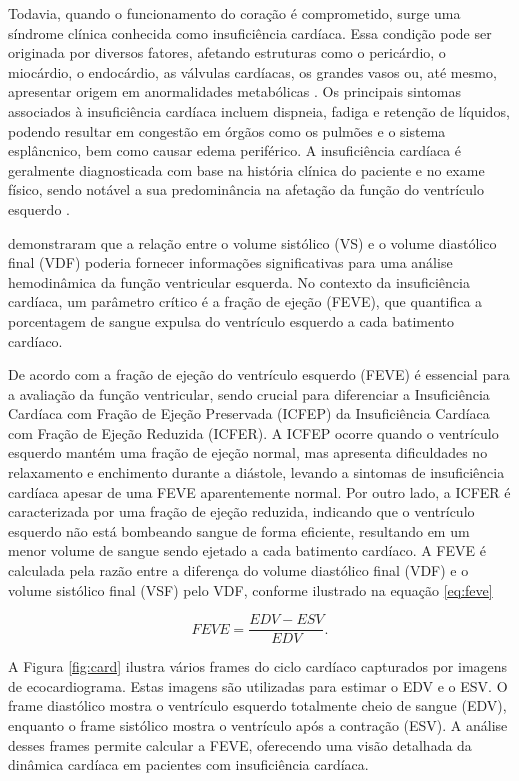 Todavia, quando o funcionamento do coração é comprometido, surge uma síndrome clínica conhecida como insuficiência cardíaca. Essa condição pode ser originada por diversos fatores, afetando estruturas como o pericárdio, o miocárdio, o endocárdio, as válvulas cardíacas, os grandes vasos ou, até mesmo, apresentar origem em anormalidades metabólicas \cite{YANCY2013e147}. Os principais sintomas associados à insuficiência cardíaca incluem dispneia, fadiga e retenção de líquidos, podendo resultar em congestão em órgãos como os pulmões e o sistema esplâncnico, bem como causar edema periférico. A insuficiência cardíaca é geralmente diagnosticada com base na história clínica do paciente e no exame físico, sendo notável a sua predominância na afetação da função do ventrículo esquerdo \cite{YANCY2013e147}.

\textcite{FOLSE1962} demonstraram que a relação entre o volume sistólico (VS) e o volume diastólico final (VDF) poderia fornecer informações significativas para uma análise hemodinâmica da função ventricular esquerda. No contexto da insuficiência cardíaca, um parâmetro crítico é a fração de ejeção (FEVE), que quantifica a porcentagem de sangue expulsa do ventrículo esquerdo a cada batimento cardíaco. 

De acordo com \textcite{Zipes2006-ke} a fração de ejeção do ventrículo esquerdo (FEVE) é essencial para a avaliação da função ventricular, sendo crucial para diferenciar a Insuficiência Cardíaca com Fração de Ejeção Preservada (ICFEP) da Insuficiência Cardíaca com Fração de Ejeção Reduzida (ICFER). A ICFEP ocorre quando o ventrículo esquerdo mantém uma fração de ejeção normal, mas apresenta dificuldades no relaxamento e enchimento durante a diástole, levando a sintomas de insuficiência cardíaca apesar de uma FEVE aparentemente normal. Por outro lado, a ICFER é caracterizada por uma fração de ejeção reduzida, indicando que o ventrículo esquerdo não está bombeando sangue de forma eficiente, resultando em um menor volume de sangue sendo ejetado a cada batimento cardíaco. A FEVE é calculada pela razão entre a diferença do volume diastólico final (VDF) e o volume sistólico final (VSF) pelo VDF, conforme ilustrado na equação \ref{eq:feve}

\begin{equation}
\label{eq:feve}
FEVE = \frac{EDV - ESV}{EDV}.
\end{equation}

A Figura \ref{fig:card} ilustra vários frames do ciclo cardíaco capturados por imagens de ecocardiograma. Estas imagens são utilizadas para estimar o EDV e o ESV. O frame diastólico mostra o ventrículo esquerdo totalmente cheio de sangue (EDV), enquanto o frame sistólico mostra o ventrículo após a contração (ESV). A análise desses frames permite calcular a FEVE, oferecendo uma visão detalhada da dinâmica cardíaca em pacientes com insuficiência cardíaca.



